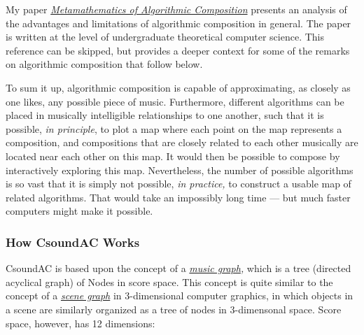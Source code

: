\documentclass[letterpaper,10pt,DIV=12,parskip=half]{scrartcl}
\begin{document}
\begin{canaryframed}
My paper \href{https://arxiv.org/pdf/2305.15601}{\emph{Metamathematics of Algorithmic Composition}} presents an analysis of the advantages and limitations of algorithmic composition in general. The paper is written at the level of undergraduate theoretical computer science. This reference can be skipped, but provides a deeper context for some of the remarks on algorithmic composition that follow below.

To sum it up, algorithmic composition is capable of approximating, as closely as one likes, any possible piece of music. Furthermore, different algorithms can be placed in musically intelligible relationships to one another, such that it is possible,\emph{ in principle}, to plot a map where each point on the map represents a composition, and compositions that are closely related to each other musically are located near each other on this map. It would then be possible to compose by interactively exploring this map. Nevertheless, the number of possible algorithms is so vast that it is simply not possible, \emph{in practice,} to construct a usable map of related algorithms. That would take an impossibly long time --- but much faster computers might make it possible.
\end{canaryframed}

\subsubsection{How CsoundAC Works}

CsoundAC is based upon the concept of a \emph{\href{https://quod.lib.umich.edu/i/icmc/bbp2372.1998.298/1}{music graph},} which is a tree (directed acyclical graph) of Nodes in score space. This concept is quite similar to the concept of a \emph{\href{https://dl.acm.org/doi/pdf/10.1145/360349.360354}{scene graph}} in 3-dimensional computer graphics, in which objects in a scene are similarly organized as a tree of nodes in 3-dimensonal space. Score space, however, has 12 dimensions:
\end{document}
